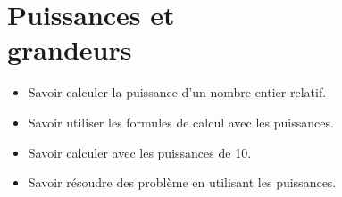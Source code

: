 \chapter{Puissances et\\grandeurs}\label{ChPuissances}

\vspace{5cm}
\begin{acquis}
\begin{itemize}
\item Savoir calculer la puissance d'un nombre entier relatif.
\item Savoir utiliser les formules de calcul avec les puissances.
\item Savoir calculer avec les puissances de 10.
\item Savoir résoudre des problème en utilisant les puissances.
\end{itemize}
\end{acquis}


\activites  


\cours


\exercicesbase
\begin{colonne*exercice}

\end{colonne*exercice}


%

\connaissances


%

\Recreation %



